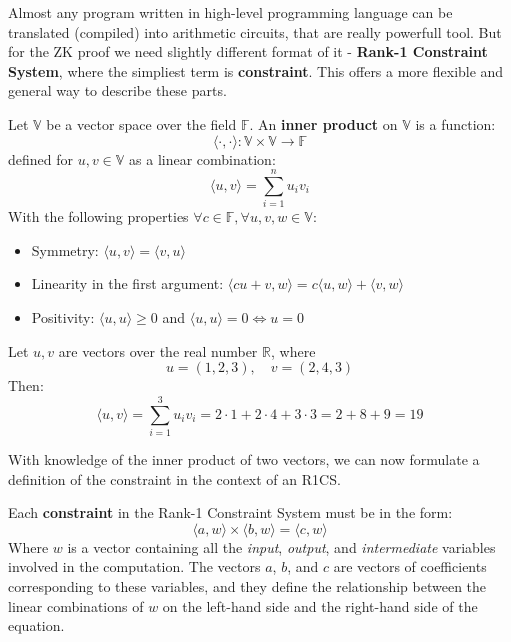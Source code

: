 \documentclass[../lecture-notes.tex]{subfiles}
\begin{document}
Almost any program written in high-level programming language can be translated (compiled) into
arithmetic circuits, that are really powerfull tool. But for the ZK proof we need slightly different
format of it - \textbf{Rank-1 Constraint System}, where the simpliest term is \textbf{constraint}. 
This offers a more flexible and general way to describe these parts.
    
\begin{definition}
    Let $\mathbb{V}$ be a vector space over the field $\mathbb{F}$. An \textbf{inner product} 
    on $\mathbb{V}$ is a function:
    \[ \langle \cdot, \cdot \rangle: \mathbb{V} \times \mathbb{V} \rightarrow \mathbb{F} \]
    defined for $u, v \in \mathbb{V}$ as a linear combination:
    \[ \langle u, v \rangle = \sum_{i=1}^{n} u_i v_i \]
    With the following properties $\forall c \in \mathbb{F}, \forall u, v, w \in \mathbb{V}$:
    \begin{itemize}
        \item Symmetry: $\langle u, v \rangle = \langle v, u \rangle$
        \item Linearity in the first argument: $\langle cu + v, w \rangle = c \langle u, w \rangle + \langle v, w \rangle$
        \item Positivity: $\langle u, u \rangle \geq 0$ and $\langle u, u \rangle = 0 \Leftrightarrow u = 0$
    \end{itemize}
\end{definition}

\begin{example}
    Let $u, v$ are vectors over the real number $\mathbb{R}$, where
    \begin{equation*}
        u = (1, 2, 3), \quad v = (2, 4, 3)
    \end{equation*}
    Then: 
    \begin{equation*}
        \langle u, v\rangle = \sum_{i=1}^{3}u_iv_i = 2 \cdot 1 + 2 \cdot 4 + 3 \cdot 3 = 2 + 8 + 9 = 19
    \end{equation*}
\end{example}

With knowledge of the inner product of two vectors, we can now formulate a definition of the 
constraint in the context of an R1CS.

\begin{definition}
    Each \textbf{constraint} in the Rank-1 Constraint System must be in the form:
    \begin{equation*}
        \langle a, w\rangle \times \langle b, w\rangle = \langle c, w\rangle
    \end{equation*}
    Where $w$ is a vector containing all the \textit{input}, \textit{output}, and 
    \textit{intermediate} variables involved in the computation. The vectors $a$, 
    $b$, and $c$ are vectors of coefficients corresponding to these variables, 
    and they define the relationship between the linear combinations of $w$ on the 
    left-hand side and the right-hand side of the equation.
\end{definition}
\end{document}
